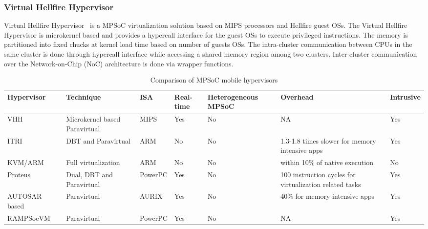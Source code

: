 \documentclass[journal, 10pt]{IEEEtran}
\begin{document}
\subsubsection{Virtual Hellfire Hypervisor}\label{sec:vhh} 
Virtual Hellfire Hypervisor~\cite{Aguiar2011a} is a MPSoC virtualization solution based on MIPS processors and Hellfire guest OSs. The Virtual Hellfire Hypervisor is microkernel based and provides a hypercall interface for the guest OSs to execute privileged instructions. The memory is partitioned into fixed chucks at kernel load time based on number of guests OSs. The intra-cluster communication between CPUs in the same cluster is done through hypercall interface while accessing a shared memory region among two clusters. Inter-cluster communication over the Network-on-Chip (NoC) architecture is done via wrapper functions. 
\begin{table*}
\centering
\caption{Comparison of MPSoC mobile hypervisors}
\label{tab:comp}    
\begin{tabular}{|m{2.6cm}|m{3.4cm}|m{1.2cm}|m{1.2cm}|m{1.8cm}|m{3.5cm}|m{1.2cm}|}
\hline
\textbf{Hypervisor} & \textbf{Technique} & \textbf{ISA} & \textbf{Real-time} & \textbf{Heterogeneous MPSoC} & \textbf{Overhead} & \textbf{Intrusive} \\
\hline
VHH~\cite{Aguiar2011a} & Microkernel based Paravirtual & MIPS & Yes & No & NA & Yes \\\hline
ITRI~\cite{Smirnov2013} & DBT and Paravirtual & ARM & No & No & 1.3-1.8 times slower for memory intensive apps & Yes \\\hline
KVM/ARM~\cite{Dall2014} & Full virtualization & ARM & No & No & within 10\% of native execution & No \\\hline
Proteus~\cite{Gilles2013} & Dual, DBT and Paravirtual & PowerPC  & Yes & No &  100 instruction cycles for virtualization related tasks & Yes \\\hline
AUTOSAR based~\cite{Reinhardt2014} & Paravirtual & AURIX & Yes & No & 40\% for memory intensive apps & Yes \\\hline
RAMPSocVM~\cite{Gohringer2011} & Paravirtual & PowerPC & Yes & No & NA & Yes \\\hline
\end{tabular}
\end{table*}
\end{document}
